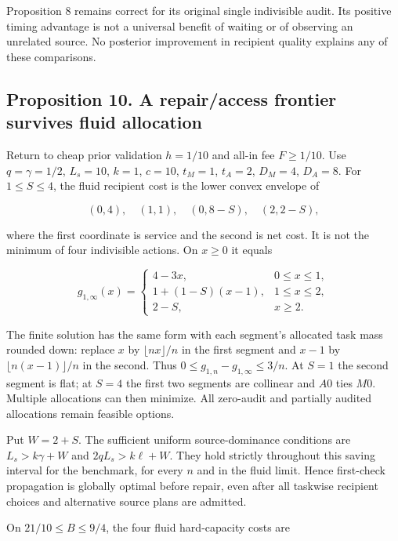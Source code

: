 \documentclass[
  11pt,
  a4paper,
]{article}
\begin{document}
Proposition 8 remains correct for its original single indivisible audit.
Its positive timing advantage is not a universal benefit of waiting or
of observing an unrelated source. No posterior improvement in recipient
quality explains any of these comparisons.

\hypertarget{proposition-10.-a-repairaccess-frontier-survives-fluid-allocation}{%
\subsection{Proposition 10. A repair/access frontier survives fluid
allocation}\label{proposition-10.-a-repairaccess-frontier-survives-fluid-allocation}}

Return to cheap prior validation \(h=1/10\) and all-in fee
\(F\geq1/10\). Use \(q=\gamma=1/2\), \(L_s=10\), \(k=1\), \(c=10\),
\(t_M=1\), \(t_A=2\), \(D_M=4\), \(D_A=8\). For \(1\leq S\leq4\), the
fluid recipient cost is the lower convex envelope of

\[(0,4),\quad(1,1),\quad(0,8-S),\quad(2,2-S), \tag{48}\]

where the first coordinate is service and the second is net cost. It is
not the minimum of four indivisible actions. On \(x\geq0\) it equals

\[g_{1,\infty}(x)=\begin{cases}
4-3x,&0\leq x\leq1,\\
1+(1-S)(x-1),&1\leq x\leq2,\\
2-S,&x\geq2.
\end{cases} \tag{49}\]

The finite solution has the same form with each segment's allocated task
mass rounded down: replace \(x\) by \(\lfloor nx\rfloor/n\) in the first
segment and \(x-1\) by \(\lfloor n(x-1)\rfloor/n\) in the second. Thus
\(0\leq g_{1,n}-g_{1,\infty}\leq3/n\). At \(S=1\) the second segment is
flat; at \(S=4\) the first two segments are collinear and \(A0\) ties
\(M0\). Multiple allocations can then minimize. All zero-audit and
partially audited allocations remain feasible options.

Put \(W=2+S\). The sufficient uniform source-dominance conditions are
\(L_s>k\gamma+W\) and \(2qL_s>k\ell+W\). They hold strictly throughout
this saving interval for the benchmark, for every \(n\) and in the fluid
limit. Hence first-check propagation is globally optimal before repair,
even after all taskwise recipient choices and alternative source plans
are admitted.

On \(21/10\leq B\leq9/4\), the four fluid hard-capacity costs are
\end{document}
